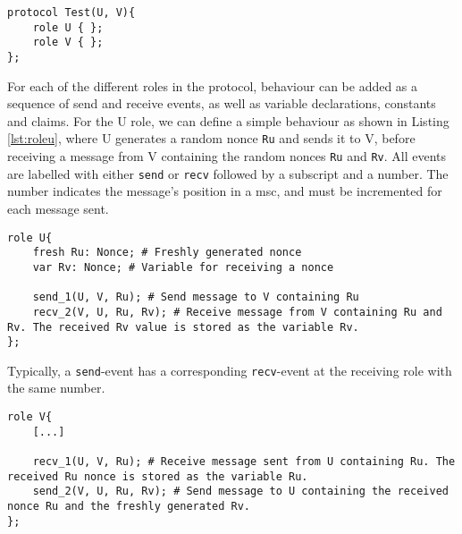 \begin{lstlisting}[caption={Example of the structure of a protocol modelled in Scyther, consisting of roles with different behaviours.}, label={lst:example}]
protocol Test(U, V){
	role U { };
	role V { };  
};
\end{lstlisting}

For each of the different roles in the protocol, behaviour can be added as a sequence of send and receive events, as well as variable declarations, constants and claims. For the U role, we can define a simple behaviour as shown in Listing \ref{lst:roleu}, where U generates a random nonce \texttt{Ru} and sends it to V, before receiving a message from V containing the random nonces \texttt{Ru} and \texttt{Rv}. All events are labelled with either \texttt{send} or \texttt{recv} followed by a subscript and a number. The number indicates the message's position in a \gls{msc}, and must be incremented for each message sent.\newline

\newpage

\begin{lstlisting}[caption={Terms can be generated, and sent and received when communicating with other agents.}, label={lst:roleu}]
role U{
	fresh Ru: Nonce; # Freshly generated nonce
	var Rv: Nonce; # Variable for receiving a nonce
	
	send_1(U, V, Ru); # Send message to V containing Ru
	recv_2(V, U, Ru, Rv); # Receive message from V containing Ru and Rv. The received Rv value is stored as the variable Rv.
};
\end{lstlisting}



Typically, a \texttt{send}-event has a corresponding \texttt{recv}-event at the receiving role with the same number.\newline


\begin{lstlisting}[caption={Corresponding events in role V to events in role U.}]
role V{
	[...]
	
	recv_1(U, V, Ru); # Receive message sent from U containing Ru. The received Ru nonce is stored as the variable Ru. 
	send_2(V, U, Ru, Rv); # Send message to U containing the received nonce Ru and the freshly generated Rv. 
};
\end{lstlisting}


